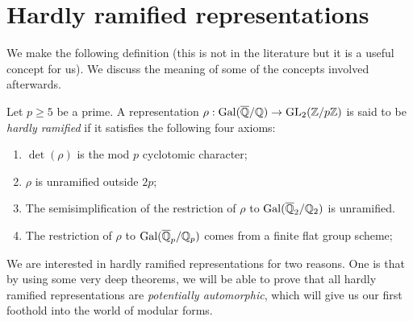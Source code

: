\section{Hardly ramified representations}

We make the following definition (this is not in the literature but it is a useful concept for us). We discuss the meaning of some of the concepts involved afterwards.

\begin{definition}\label{hardly_ramified} Let $p\geq5$ be a prime. A representation $\rho: \operatorname{Gal}(\overline{\mathbb{Q}}/\mathbb{Q})\to \operatorname{GL}_2(\mathbb{Z}/p\mathbb{Z})$ is said to be \emph{hardly ramified} if it satisfies the following four axioms:
  \begin{enumerate}
  \item $\det(\rho)$ is the mod $p$ cyclotomic character;
  \item $\rho$ is unramified outside $2p$;
  \item The semisimplification of the restriction of $\rho$ to $\operatorname{Gal}(\overline{\mathbb{Q}}_2/\mathbb{Q}_2)$ is unramified.
  \item The restriction of $\rho$ to $\operatorname{Gal}(\overline{\mathbb{Q}}_p/\mathbb{Q}_p)$ comes from a finite flat group scheme;
  \end{enumerate}
\end{definition}

We are interested in hardly ramified representations for two reasons. One is that by using some very deep theorems, we will be able to prove that all hardly ramified representations are \emph{potentially automorphic}, which will give us our first foothold into the world of modular forms.

%
%
%

